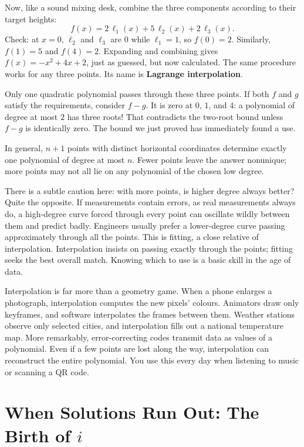 Now, like a sound mixing desk, combine the three components according to their target heights:
\[
f(x) = 2\,\ell_1(x) + 5\,\ell_2(x) + 2\,\ell_3(x).
\]
Check: at $x=0$, $\ell_2$ and $\ell_3$ are $0$ while $\ell_1=1$, so $f(0)=2$. Similarly, $f(1)=5$ and $f(4)=2$. Expanding and combining gives $f(x)=-x^2+4x+2$, just as guessed, but now calculated. The same procedure works for any three points. Its name is \textbf{Lagrange interpolation}.

\begin{zhu}[Uniqueness]
Only one quadratic polynomial passes through these three points. If both $f$ and $g$ satisfy the requirements, consider $f-g$. It is zero at $0$, $1$, and $4$: a polynomial of degree at most $2$ has three roots! That contradicts the two-root bound unless $f-g$ is identically zero. The bound we just proved has immediately found a use.
\end{zhu}

In general, $n+1$ points with distinct horizontal coordinates determine exactly one polynomial of degree at most $n$. Fewer points leave the answer nonunique; more points may not all lie on any polynomial of the chosen low degree.

There is a subtle caution here: with more points, is higher degree always better? Quite the opposite. If measurements contain errors, as real measurements always do, a high-degree curve forced through every point can oscillate wildly between them and predict badly. Engineers usually prefer a lower-degree curve passing approximately through all the points. This is fitting, a close relative of interpolation. Interpolation insists on passing exactly through the points; fitting seeks the best overall match. Knowing which to use is a basic skill in the age of data.

\begin{lianjie}
Interpolation is far more than a geometry game. When a phone enlarges a photograph, interpolation computes the new pixels' colours. Animators draw only keyframes, and software interpolates the frames between them. Weather stations observe only selected cities, and interpolation fills out a national temperature map. More remarkably, error-correcting codes transmit data as values of a polynomial. Even if a few points are lost along the way, interpolation can reconstruct the entire polynomial. You use this every day when listening to music or scanning a QR code.
\end{lianjie}

\section{When Solutions Run Out: The Birth of $i$}

